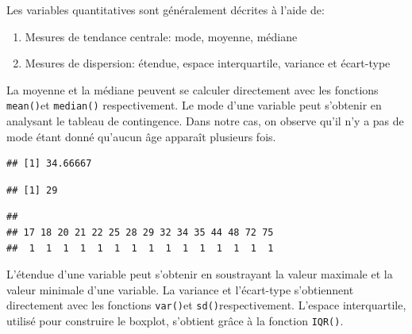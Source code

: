 \documentclass[
]{book}
\newenvironment{Shaded}{\begin{snugshade}}{\end{snugshade}}
\newcommand{\FunctionTok}[1]{\textcolor[rgb]{0.13,0.29,0.53}{\textbf{#1}}}
\newcommand{\NormalTok}[1]{#1}
\newcommand{\SpecialCharTok}[1]{\textcolor[rgb]{0.81,0.36,0.00}{\textbf{#1}}}
\providecommand{\tightlist}{%
  \setlength{\itemsep}{0pt}\setlength{\parskip}{0pt}}
\begin{document}
Les variables quantitatives sont généralement décrites à l'aide de:

\begin{enumerate}
\def\labelenumi{\arabic{enumi}.}
\tightlist
\item
  Mesures de tendance centrale: mode, moyenne, médiane
\item
  Mesures de dispersion: étendue, espace interquartile, variance et écart-type
\end{enumerate}

La moyenne et la médiane peuvent se calculer directement avec les fonctions \texttt{mean()}et \texttt{median()} respectivement. Le mode d'une variable peut s'obtenir en analysant le tableau de contingence. Dans notre cas, on observe qu'il n'y a pas de mode étant donné qu'aucun âge apparaît plusieurs fois.

\begin{Shaded}
\end{Shaded}

\begin{verbatim}
## [1] 34.66667
\end{verbatim}

\begin{Shaded}
\end{Shaded}

\begin{verbatim}
## [1] 29
\end{verbatim}

\begin{Shaded}
\end{Shaded}

\begin{verbatim}
## 
## 17 18 20 21 22 25 28 29 32 34 35 44 48 72 75 
##  1  1  1  1  1  1  1  1  1  1  1  1  1  1  1
\end{verbatim}

L'étendue d'une variable peut s'obtenir en soustrayant la valeur maximale et la valeur minimale d'une variable. La variance et l'écart-type s'obtiennent directement avec les fonctions \texttt{var()}et \texttt{sd()}respectivement. L'espace interquartile, utilisé pour construire le boxplot, s'obtient grâce à la fonction \texttt{IQR()}.
\end{document}
